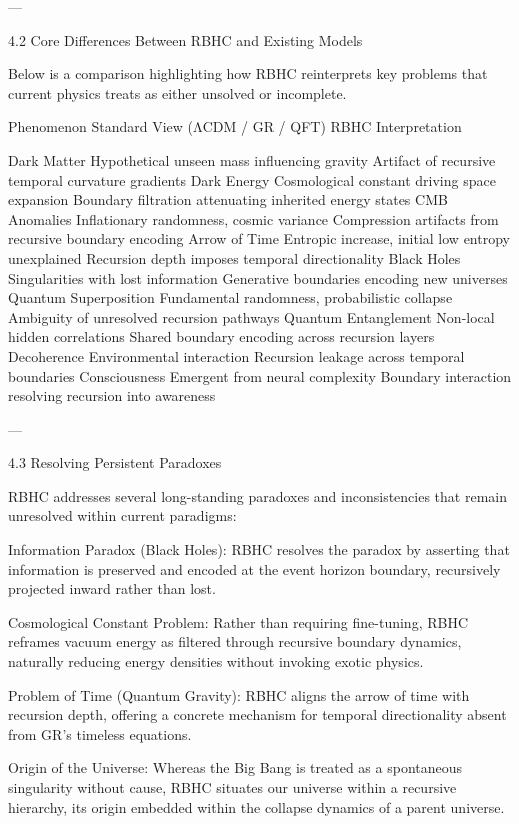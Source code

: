 \documentclass[11pt,a4paper]{article}
\begin{document}
---

4.2 Core Differences Between RBHC and Existing Models

Below is a comparison highlighting how RBHC reinterprets key problems that current physics treats as either unsolved or incomplete.

Phenomenon	Standard View (ΛCDM / GR / QFT)	RBHC Interpretation

Dark Matter	Hypothetical unseen mass influencing gravity	Artifact of recursive temporal curvature gradients
Dark Energy	Cosmological constant driving space expansion	Boundary filtration attenuating inherited energy states
CMB Anomalies	Inflationary randomness, cosmic variance	Compression artifacts from recursive boundary encoding
Arrow of Time	Entropic increase, initial low entropy unexplained	Recursion depth imposes temporal directionality
Black Holes	Singularities with lost information	Generative boundaries encoding new universes
Quantum Superposition	Fundamental randomness, probabilistic collapse	Ambiguity of unresolved recursion pathways
Quantum Entanglement	Non-local hidden correlations	Shared boundary encoding across recursion layers
Decoherence	Environmental interaction	Recursion leakage across temporal boundaries
Consciousness	Emergent from neural complexity	Boundary interaction resolving recursion into awareness



---

4.3 Resolving Persistent Paradoxes

RBHC addresses several long-standing paradoxes and inconsistencies that remain unresolved within current paradigms:

Information Paradox (Black Holes):
RBHC resolves the paradox by asserting that information is preserved and encoded at the event horizon boundary, recursively projected inward rather than lost.

Cosmological Constant Problem:
Rather than requiring fine-tuning, RBHC reframes vacuum energy as filtered through recursive boundary dynamics, naturally reducing energy densities without invoking exotic physics.

Problem of Time (Quantum Gravity):
RBHC aligns the arrow of time with recursion depth, offering a concrete mechanism for temporal directionality absent from GR’s timeless equations.

Origin of the Universe:
Whereas the Big Bang is treated as a spontaneous singularity without cause, RBHC situates our universe within a recursive hierarchy, its origin embedded within the collapse dynamics of a parent universe.
\end{document}
